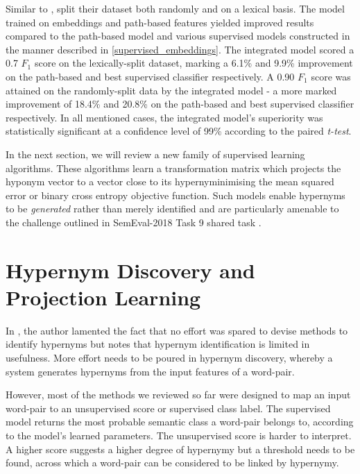 Similar to \citep{levy2015supervised}, \citeauthor{shwartz2016path} split their dataset both randomly and on a lexical basis.  The model trained on embeddings and path-based features yielded improved results compared to the path-based model and various supervised models constructed in the manner described in \ref{supervised_embeddings}.  The integrated model scored a 0.7 $F_1$ score on the lexically-split dataset, marking a 6.1\% and 9.9\% improvement on the path-based and best supervised classifier respectively.  A 0.90 $F_1$ score was attained on the randomly-split data by the integrated model -  a more marked improvement of 18.4\% and 20.8\% on the path-based and best supervised classifier respectively.  In all mentioned cases, the integrated model's superiority was statistically significant at a confidence level of 99\% according to the paired \textit{t-test}. 

In the next section, we will review a new family of supervised learning algorithms.  These algorithms learn a transformation matrix which projects the hyponym vector to a vector close to its hypernyminimising
the mean squared error or binary cross entropy objective function.  Such models enable hypernyms to be \textit{generated} rather than merely identified and are particularly amenable to the challenge outlined in SemEval-2018 Task 9 shared task \citep{camacho2018semeval}.

\section{Hypernym Discovery and Projection Learning}
In \citep{camacho2017we}, the author lamented the fact that no effort was spared to devise methods to identify hypernyms but notes that hypernym identification is limited in usefulness.  More effort needs to be poured in hypernym discovery, whereby a system generates hypernyms from the input features of a word-pair.  

However, most of the methods we reviewed so far were designed to map an input word-pair to an unsupervised score or supervised class label.  The supervised model returns the most probable semantic class a word-pair belongs to, according to the model’s learned parameters.  The unsupervised score is harder to interpret.  A higher score suggests a higher degree of hypernymy but a threshold needs to be found, across which a word-pair can be considered to be linked by hypernymy.  

